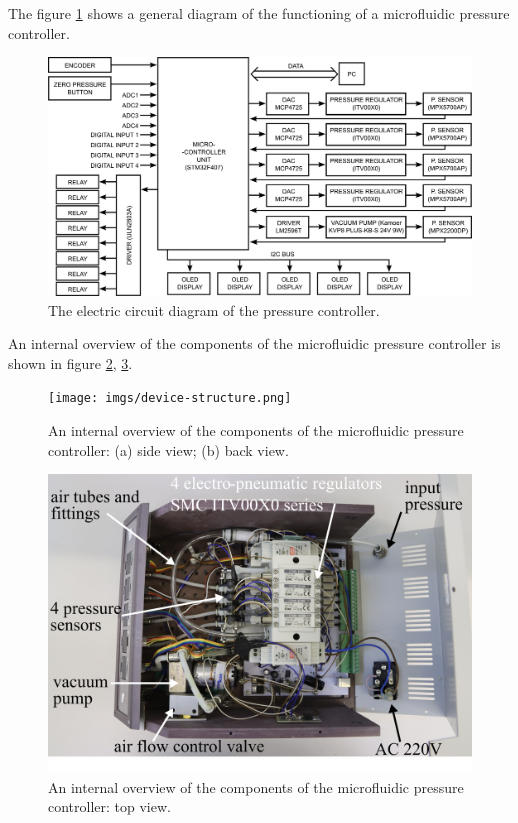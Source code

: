 \documentclass[twoside, 12pt, a4paper]{refart}
\begin{document}
    The figure \ref{fig:mainscheme} shows a general diagram of the functioning of a microfluidic pressure controller.
    
    \begin{figure}[H]
	  \begin{center}
	  \includegraphics[width=\textwidth]{imgs/main-scheme.png}
	  \caption{The electric circuit diagram of the pressure controller.}
	  \label{fig:mainscheme}
	  \end{center}
    \end{figure}
    
    An internal overview of the components of the microfluidic pressure controller is shown in figure \ref{fig:device-structure}, \ref{fig:device-structure2}.
    \begin{figure}[H]
	  \begin{center}
	  \texttt{[image: imgs/device-structure.png]}
	  \caption{An internal overview of the components of the microfluidic pressure controller: (a) side view; (b) back view.}
	  \label{fig:device-structure}
	  \end{center}
    \end{figure}
    
    \begin{figure}[H]
	  \begin{center}
	  \includegraphics[width=\textwidth]{imgs/device-structure2.png}
	  \caption{An internal overview of the components of the microfluidic pressure controller: top view.}
	  \label{fig:device-structure2}
	  \end{center}
    \end{figure}
  
\end{document}
